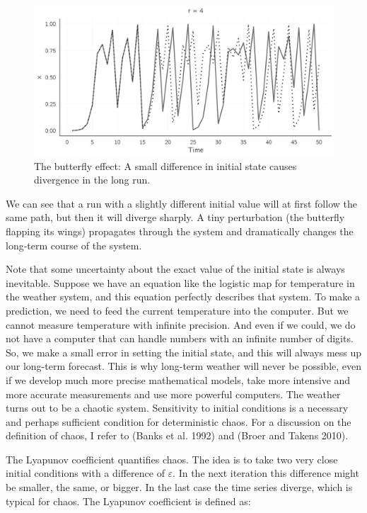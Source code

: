 \documentclass[
  a4paper,
  DIV=11,
  numbers=noendperiod,
  oneside]{scrreprt}
\begin{document}
\begin{figure}

{\centering \includegraphics{media/ch2/fig-ch2-img6.jpg}

}

\caption{\label{fig-ch2-img6}The butterfly effect: A small difference in
initial state causes divergence in the long run.}

\end{figure}

We can see that a run with a slightly different initial value will at
first follow the same path, but then it will diverge sharply. A tiny
perturbation (the butterfly flapping its wings) propagates through the
system and dramatically changes the long-term course of the system.

Note that some uncertainty about the exact value of the initial state is
always inevitable. Suppose we have an equation like the logistic map for
temperature in the weather system, and this equation perfectly describes
that system. To make a prediction, we need to feed the current
temperature into the computer. But we cannot measure temperature with
infinite precision. And even if we could, we do not have a computer that
can handle numbers with an infinite number of digits. So, we make a
small error in setting the initial state, and this will always mess up
our long-term forecast. This is why long-term weather will never be
possible, even if we develop much more precise mathematical models, take
more intensive and more accurate measurements and use more powerful
computers. The weather turns out to be a chaotic system. Sensitivity to
initial conditions is a necessary and perhaps sufficient condition for
deterministic chaos. For a discussion on the definition of chaos, I
refer to (Banks et al. 1992) and (Broer and Takens 2010).

The Lyapunov coefficient quantifies chaos. The idea is to take two very
close initial conditions with a difference of \(\varepsilon\). In the
next iteration this difference might be smaller, the same, or bigger. In
the last case the time series diverge, which is typical for chaos. The
Lyapunov coefficient is defined as:
\end{document}
